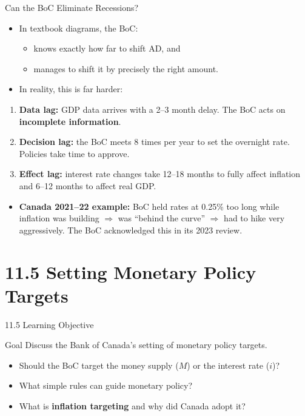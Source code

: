 \documentclass[aspectratio=169]{beamer}
\begin{document}
\begin{frame}{Can the BoC Eliminate Recessions?}
\transfade
\begin{itemize}
  \item In textbook diagrams, the BoC:
  \begin{itemize}
    \item knows exactly how far to shift AD, and
    \item manages to shift it by precisely the right amount.
  \end{itemize}
  \item In reality, this is far harder:
\end{itemize}
\begin{enumerate}
  \item \textbf{Data lag:} GDP data arrives with a 2--3 month delay. The BoC acts on \textbf{incomplete information}.
  \item \textbf{Decision lag:} the BoC meets 8 times per year to set the overnight rate. Policies take time to approve.
  \item \textbf{Effect lag:} interest rate changes take \alert{12--18 months} to fully affect inflation and 6--12 months to affect real GDP.
\end{enumerate}
\begin{itemize}
  \item \textbf{Canada 2021--22 example:} BoC held rates at 0.25\% too long while inflation was building $\Rightarrow$ was ``behind the curve'' $\Rightarrow$ had to hike very aggressively. The BoC acknowledged this in its 2023 review.
\end{itemize}
\end{frame}

\section{11.5 Setting Monetary Policy Targets}

\begin{frame}{11.5 Learning Objective}
\transfade
\begin{block}{Goal}
Discuss the Bank of Canada's setting of monetary policy targets.
\end{block}
\begin{itemize}
  \item Should the BoC target the money supply ($M$) or the interest rate ($i$)?
  \item What simple rules can guide monetary policy?
  \item What is \textbf{inflation targeting} and why did Canada adopt it?
\end{itemize}
\end{frame}
\end{document}
